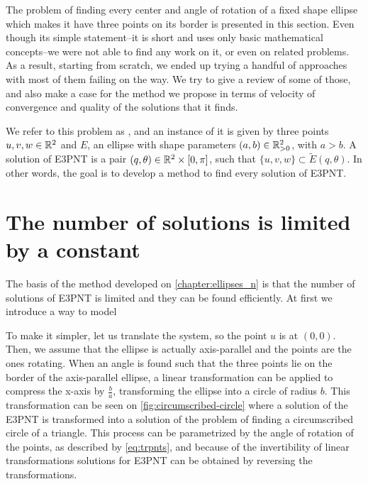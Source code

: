 The problem of finding every center and angle of rotation of a fixed shape ellipse which makes it have three points on its border is presented in this section. Even though its simple statement--it is short and uses only basic mathematical concepts--we were not able to find any work on it, or even on related problems. 
As a result, starting from scratch, we ended up trying a handful of approaches with most of them failing on the way. We try to give a review of some of those, and also make a case for the method we propose in terms of velocity of convergence and quality of the solutions that it finds.

We refer to this problem as , and an instance of it is given by three points $u, v, w \in \mathbb{R}^2$ and $E$, an ellipse with shape parameters $(a, b) \in \mathbb{R}^2_{>0}$, with $a > b$. A solution of E3PNT is a pair $(q, \theta) \in \mathbb{R}^2\times[0, \pi]$, such that $\{u, v, w\} \subset \tilde{E}(q, \theta)$. In other words, the goal is to develop a method to find every solution of E3PNT.

\section{The number of solutions is limited by a constant}

The basis of the method developed on \autoref{chapter:ellipses_n} is that the number of solutions of E3PNT is limited and they can be found efficiently. At first we introduce a way to model 

To make it simpler, let us translate the system, so the point $u$ is at $(0,0)$. Then, we assume that the ellipse is actually axis-parallel and the points are the ones rotating. When an angle is found such that the three points lie on the border of the axis-parallel ellipse, a linear transformation can be applied to compress the x-axis by $\frac{b}{a}$, transforming the ellipse into a circle of radius $b$. This transformation can be seen on \autoref{fig:circumscribed-circle} where a solution of the E3PNT is transformed into a solution of the problem of finding a circumscribed circle of a triangle. 
This process can be parametrized by the angle of rotation of the points, as described by \autoref{eq:trpnts}, and because of the invertibility of linear transformations solutions for E3PNT can be obtained by reversing the transformations.

